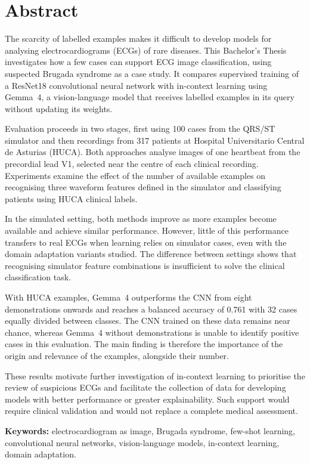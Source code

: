 \chapter*{Abstract}

The scarcity of labelled examples makes it difficult to develop models for analysing electrocardiograms (ECGs) of rare diseases. This Bachelor's Thesis investigates how a few cases can support ECG image classification, using suspected Brugada syndrome as a case study. It compares supervised training of a ResNet18 convolutional neural network with in-context learning using Gemma~4, a vision-language model that receives labelled examples in its query without updating its weights.

Evaluation proceeds in two stages, first using 100 cases from the QRS/ST simulator and then recordings from 317 patients at Hospital Universitario Central de Asturias (HUCA). Both approaches analyse images of one heartbeat from the precordial lead V1, selected near the centre of each clinical recording. Experiments examine the effect of the number of available examples on recognising three waveform features defined in the simulator and classifying patients using HUCA clinical labels.

In the simulated setting, both methods improve as more examples become available and achieve similar performance. However, little of this performance transfers to real ECGs when learning relies on simulator cases, even with the domain adaptation variants studied. The difference between settings shows that recognising simulator feature combinations is insufficient to solve the clinical classification task.

With HUCA examples, Gemma~4 outperforms the CNN from eight demonstrations onwards and reaches a balanced accuracy of 0.761 with 32 cases equally divided between classes. The CNN trained on these data remains near chance, whereas Gemma~4 without demonstrations is unable to identify positive cases in this evaluation. The main finding is therefore the importance of the origin and relevance of the examples, alongside their number.

These results motivate further investigation of in-context learning to prioritise the review of suspicious ECGs and facilitate the collection of data for developing models with better performance or greater explainability. Such support would require clinical validation and would not replace a complete medical assessment.

\textbf{Keywords:} electrocardiogram as image, Brugada syndrome, few-shot learning, convolutional neural networks, vision-language models, in-context learning, domain adaptation.
